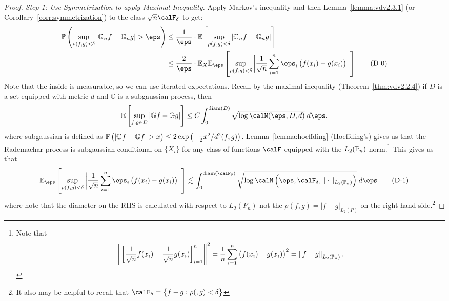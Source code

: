 \begin{proof}
	\textit{Step 1: Use Symmetrization to apply Maximal Inequality.} Apply Markov's inequality and then Lemma~\ref{lemma:vdv2.3.1} (or Corollary~\ref{corr:symmetrization}) to the class \(\sqrt{n}\calF_\delta\) to get:
	\begin{align*}
		\P\left(\sup_{\rho(f,g)<\delta}\left|\mathbb{G}_nf-\mathbb{G}_ng\right|>\eps\right)
		&\leq\frac{1}{\eps}\cdot\E\left[\sup_{\rho(f,g)<\delta}\left|\mathbb{G}_nf-\mathbb{G}_ng\right|\right] \\
		&\leq \frac{2}{\eps}\cdot\E_X\E_\eps\left[\sup_{\rho(f,g)<\delta}\bigg|\frac{1}{\sqrt{n}}\sum_{i=1}^n \eps_i\left(f(x_i)-g(x_i)\right)\bigg|\right]\tag{D-0}\label{eq:donsker0}
	\end{align*}
	Note that the inside is measurable, so we can use iterated expectations. Recall by the maximal inequality (Theorem~\ref{thm:vdv2.2.4}) if \(D\) is a set equipped with metric  \(d\) and  \(\mathbb{G}\) is a subgaussian process, then
	\[
		\E\left[\sup_{f,g\in D}\left|\mathbb{G}f-\mathbb{G}g\right|\right] \leq C \int_{0}^{\text{diam}(D)}\sqrt{\log\calN(\eps,D,d)}\;d\eps  
	.\]
	where subgaussian is defined as \(\P\left(\left|\mathbb{G}f-\mathbb{G}f\right|>x\right) \leq  2\exp\left(-\frac{1}{2}x^2/d^2(f,g)\right)\). Lemma~\ref{lemma:hoeffding} (Hoeffding's) gives us that the Rademachar process is subgaussian conditional on \(\{X_i\}\) for any class of functions \(\calF\) equipped with the  \(L_2(\P_n)\) norm.\footnote{Note that \[
			\left\|\left[\frac{1}{\sqrt n}f(x_i)-\frac{1}{\sqrt n}g(x_i)\right]_{i=1}^n\right\|^2 = \frac{1}{n}\sum_{i=1}^n \left(f(x_i)-g(x_i)\right)^2 = \left\|f-g\right\|_ {L_2(\P_n)}
	.\] } This gives us that
	\begin{equation}
		\label{eq:donsker1}
		\E_\eps\left[\sup_{\rho(f,g)<\delta}\bigg|\frac{1}{\sqrt n}\sum_{i=1}^n \eps_i\left(f(x_i)-g(x_i)\right)\bigg|\right]\lesssim \int_{0}^{\text{diam}(\calF_\delta)} \sqrt{\log\calN\left(\eps,\calF_\delta,\|\cdot\|_{L_2(\P_n)}\right)}\;d\eps\tag{D-1} 
	\end{equation}
	where note that the diameter on the RHS is calculated with respect to \(L_2(P_n)\) not the \(\rho(f,g) = \left|f-g\right|_{L_2(P)}\) on the right hand side.\footnote{It also may be helpful to recall that \(\calF_\delta =\left\{f-g:\rho(,g)<\delta\right\}\)} 


\end{proof}
